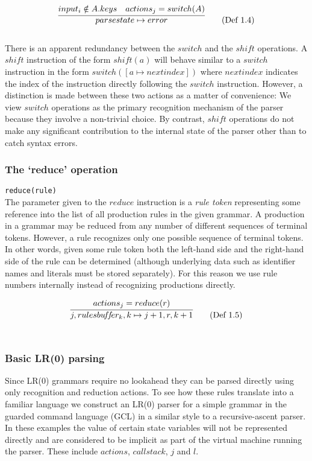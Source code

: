 \documentclass[a4paper,11pt]{article}
\begin{document}
\begin{equation}
\infer{parsestate \mapsto error}{input_i \notin A.keys & actions_j = switch(A)} \tag{Def 1.4}
\end{equation}\\

There is an apparent redundancy between the $switch$ and the $shift$ operations. 
A $shi\!ft$ instruction of the form $sh\!ift(a)$ will behave similar to a $switch$ instruction in the form $switch([a \mapsto nextindex])$ where $nextindex$ indicates the index of the instruction directly following the $switch$ instruction.
However, a distinction is made between these two actions as a matter of convenience: 
We view $switch$ operations as the primary recognition mechanism of the parser because they involve a non-trivial choice.
By contrast, $shi\!ft$ operations do not make any significant contribution to the internal state of the parser other than to catch syntax errors.
	
\subsubsection{The `reduce' operation}
\texttt{reduce(rule)}\\
The parameter given to the $reduce$ instruction is a \emph{rule token} representing some reference into the list of all production rules in the given grammar.
A production in a grammar may be reduced from any number of different sequences of terminal tokens. However, a rule recognizes only one possible sequence of terminal tokens.
In other words, given some rule token both the left-hand side and the right-hand side of the rule can be determined (although underlying data such as identifier names and literals must be stored separately).
For this reason we use rule numbers internally instead of recognizing productions directly.

\begin{equation}
\infer{j, rulesbu\!f\!f\!er_k, k \mapsto j+1, r, k+1}{actions_j = reduce(r)} \tag{Def 1.5}
\end{equation}\\

\subsubsection{Basic LR(0) parsing}

Since LR(0) grammars require no lookahead they can be parsed directly using only recognition and reduction actions.
To see how these rules translate into a familiar language we construct an LR(0) parser for a simple grammar in the guarded command language (GCL) in a similar style to a recursive-ascent parser.
In these examples the value of certain state variables will not be represented directly and are considered to be implicit as part of the virtual machine running the parser.
These include $actions$, $callstack$, $j$ and $l$.
\end{document}
